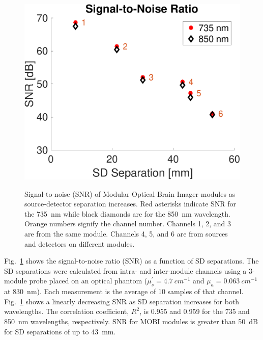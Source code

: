 \begin{figure}
	\begin{center}
	    {\includegraphics[width=.45\textwidth]{fig/mobi/snr.pdf}}
	\end{center}
	\caption{Signal-to-noise (SNR) of Modular Optical Brain Imager modules as source-detector separation increases. Red asterisks indicate SNR for the 735~nm while black diamonds are for the 850~nm wavelength. Orange numbers signify the channel number. Channels 1, 2, and 3 are from the same module. Channels 4, 5, and 6 are from sources and detectors on different modules.} 
	\label{fig:snr}
\end{figure} 
Fig.~\ref{fig:snr} shows the signal-to-noise ratio (SNR) as a function of SD separations. The SD separations were calculated from intra- and inter-module channels using a 3-module probe placed on an optical phantom ($\mu_{s}^{'} = 4.7~cm^{-1}$ and $\mu_{a} = 0.063~cm^{-1}$ at 830~nm). Each measurement is the average of 10 samples of that channel. Fig.~\ref{fig:snr} shows a linearly decreasing SNR as SD separation increases for both wavelengths. The correlation coefficient, $R^2$, is 0.955 and 0.959 for the 735 and 850~nm wavelengths, respectively. SNR for \ac{MOBI} modules is greater than 50~dB for SD separations of up to 43~mm. 


